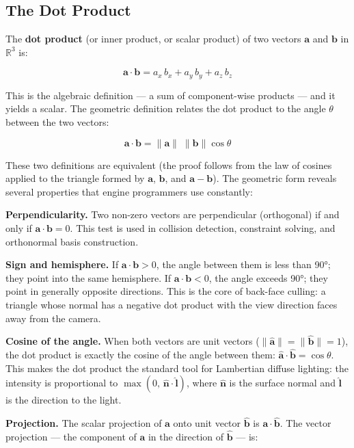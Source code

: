 \documentclass[
  11pt,
  letterpaper,
  DIV=11,
  numbers=noendperiod,
  twoside,
  open=right]{scrreprt}
\begin{document}
\subsection{The Dot Product}\label{the-dot-product}

The \textbf{dot product} (or inner product, or scalar product) of two
vectors \(\mathbf{a}\) and \(\mathbf{b}\) in \(\mathbb{R}^3\) is:

\[
\mathbf{a} \cdot \mathbf{b} = a_x \, b_x + a_y \, b_y + a_z \, b_z
\]

This is the algebraic definition --- a sum of component-wise products
--- and it yields a scalar. The geometric definition relates the dot
product to the angle \(\theta\) between the two vectors:

\[
\mathbf{a} \cdot \mathbf{b} = \|\mathbf{a}\| \; \|\mathbf{b}\| \cos\theta
\]

These two definitions are equivalent (the proof follows from the law of
cosines applied to the triangle formed by \(\mathbf{a}\),
\(\mathbf{b}\), and \(\mathbf{a} - \mathbf{b}\)). The geometric form
reveals several properties that engine programmers use constantly:

\textbf{Perpendicularity.} Two non-zero vectors are perpendicular
(orthogonal) if and only if \(\mathbf{a} \cdot \mathbf{b} = 0\). This
test is used in collision detection, constraint solving, and orthonormal
basis construction.

\textbf{Sign and hemisphere.} If \(\mathbf{a} \cdot \mathbf{b} > 0\),
the angle between them is less than 90°; they point into the same
hemisphere. If \(\mathbf{a} \cdot \mathbf{b} < 0\), the angle exceeds
90°; they point in generally opposite directions. This is the core of
back-face culling: a triangle whose normal has a negative dot product
with the view direction faces away from the camera.

\textbf{Cosine of the angle.} When both vectors are unit vectors
(\(\|\hat{\mathbf{a}}\| = \|\hat{\mathbf{b}}\| = 1\)), the dot product
is exactly the cosine of the angle between them:
\(\hat{\mathbf{a}} \cdot \hat{\mathbf{b}} = \cos\theta\). This makes the
dot product the standard tool for Lambertian diffuse lighting: the
intensity is proportional to
\(\max(0, \, \hat{\mathbf{n}} \cdot \hat{\mathbf{l}})\), where
\(\hat{\mathbf{n}}\) is the surface normal and \(\hat{\mathbf{l}}\) is
the direction to the light.

\textbf{Projection.} The scalar projection of \(\mathbf{a}\) onto unit
vector \(\hat{\mathbf{b}}\) is \(\mathbf{a} \cdot \hat{\mathbf{b}}\).
The vector projection --- the component of \(\mathbf{a}\) in the
direction of \(\hat{\mathbf{b}}\) --- is:
\end{document}
